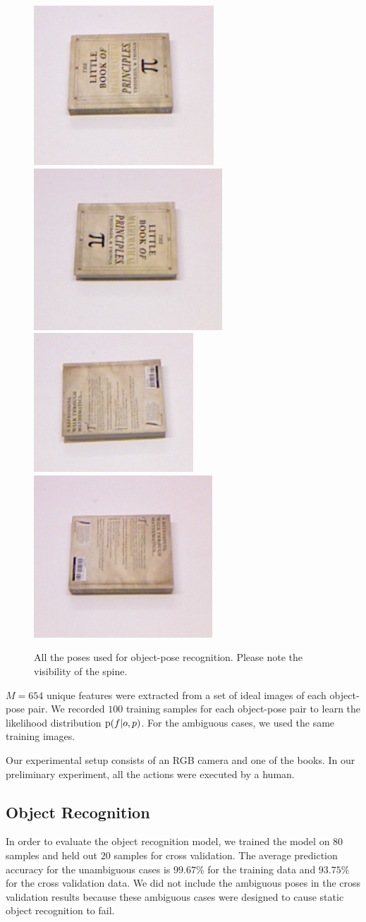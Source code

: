     
     \begin{figure}
     \centering
    		\includegraphics[width = 0.2\columnwidth]{pics/math_cover1.jpg}
    		\includegraphics[width = 0.2\columnwidth]{pics/math_cover1_rot.jpg}
    		\includegraphics[width = 0.2\columnwidth]{pics/math_down.jpg}
    		\includegraphics[width = 0.2\columnwidth]{pics/math_down_rot.jpg}
    		\caption{All the poses used for object-pose recognition. Please note the visibility of the spine.}
	\label{fig:pose_dataset}
    \end{figure}       
    
    
$M = 654$ unique features were extracted from a set of ideal images of each object-pose pair. We recorded $100$ training samples for each object-pose pair to learn the likelihood distribution $\text{p}(f|o,p)$. For the ambiguous cases, we used the same training images.

    Our experimental setup consists of an RGB camera and one of the books. In our preliminary experiment, all the actions were executed by a human.

    \subsection{Object Recognition}
    
	In order to evaluate the object recognition model, we trained the model on $80$ samples and held out $20$ samples for cross validation. The average prediction accuracy for the unambiguous cases is $99.67\%$ for the training data and $93.75\%$ for the cross validation data. We did not include the ambiguous poses in the cross validation results because these ambiguous cases were designed to cause static object recognition to fail. %
    
